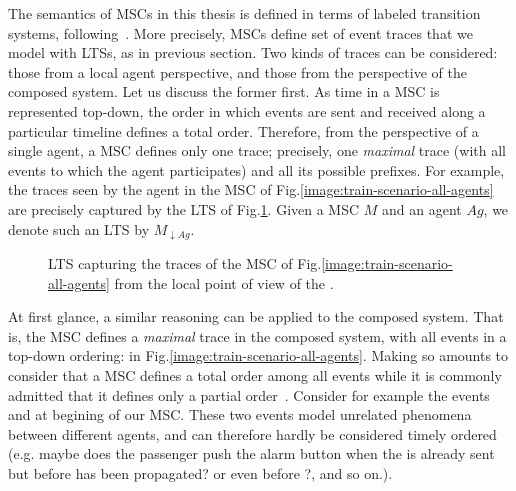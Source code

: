 The semantics of MSCs in this thesis is defined in terms of labeled transition systems, following~\cite{Uchitel:2003}. More precisely, MSCs define set of event traces that we model with LTSs, as in previous section. Two kinds of traces can be considered: those from a local agent perspective, and those from the perspective of the composed system. Let us discuss the former first. As time in a MSC is represented top-down, the order in which events are sent and received along a particular timeline defines a total order. Therefore, from the perspective of a single agent, a MSC defines only one trace; precisely, one \emph{maximal} trace (with all events to which the agent participates) and all its possible prefixes. For example, the traces seen by the  agent in the MSC of Fig.\ref{image:train-scenario-all-agents} are precisely captured by the LTS of Fig.\ref{image:local-traces-lts}. Given a MSC $M$ and an agent $Ag$, we denote such an LTS by $M_{\downarrow Ag}$.

\vspace{0.5cm}
\begin{figure}[H]\centering
{}
\caption{LTS capturing the traces of the MSC of Fig.\ref{image:train-scenario-all-agents} from the local point of view of the .\label{image:local-traces-lts}}
\end{figure}

At first glance, a similar reasoning can be applied to the composed system. That is, the MSC defines a \emph{maximal} trace in the composed system, with all events in a top-down ordering:  in Fig.\ref{image:train-scenario-all-agents}. Making so amounts to consider that a MSC defines a total order among all events while it is commonly admitted that it defines only a partial order~\cite{ITU:1996, Uchitel:2003}. Consider for example the events  and  at begining of our MSC. These two events model unrelated phenomena between different agents, and can therefore hardly be considered timely ordered (e.g. maybe does the passenger push the alarm button when the  is already sent but before  has been propagated? or even before ?, and so on.). 

